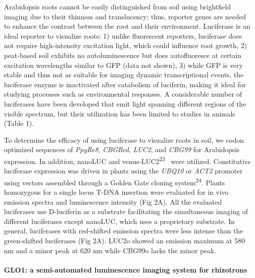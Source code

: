 \documentclass[]{article}
\begin{document}
Arabidopsis roots cannot be easily distinguished from soil using
brightfield imaging due to their thinness and translucency; thus,
reporter genes are needed to enhance the contrast between the root and
their environment. Luciferase is an ideal reporter to visualize roots:
1) unlike fluorescent reporters, luciferase does not require
high-intensity excitation light, which could influence root growth, 2)
peat-based soil exhibits no autoluminescence but does autofluoresce at
certain excitation wavelengths similar to GFP (data not shown), 3) while
GFP is very stable and thus not as suitable for imaging dynamic
transcriptional events, the luciferase enzyme is inactivated after
catabolism of luciferin, making it ideal for studying processes such as
environmental responses. A considerable number of luciferases have been
developed that emit light spanning different regions of the visible
spectrum, but their utilization has been limited to studies in animals
(Table 1).

To determine the efficacy of using luciferase to visualize roots in
soil, we codon optimized sequences of \emph{PpyRe8}, \emph{CBGRed},
\emph{LUC2}, and \emph{CBG99} for Arabidopsis expression. In addition,
nanoLUC and venus-LUC2\textsuperscript{23} ~were utilized. Constitutive
luciferase expression was driven in plants using the \emph{UBQ10} or
\emph{ACT2} promoter using vectors assembled through a Golden Gate
cloning system\textsuperscript{24}. Plants homozygous for a single locus
T-DNA insertion were evaluated for in vivo emission spectra and
luminescence intensity (Fig 2A). All the evaluated luciferases use
D-luciferin as a substrate facilitating the simultaneous imaging of
different luciferases except nanoLUC, which uses a proprietary
substrate. In general, luciferases with red-shifted emission spectra
were less intense than the green-shifted luciferases (Fig 2A). LUC2o
showed an emission maximum at 580 nm and a minor peak at 620 nm while
CBG99o lacks the minor peak.

\paragraph{GLO1: a semi-automated luminescence imaging system for
rhizotrons}\label{glo1-a-semi-automated-luminescence-imaging-system-for-rhizotrons}
\end{document}
